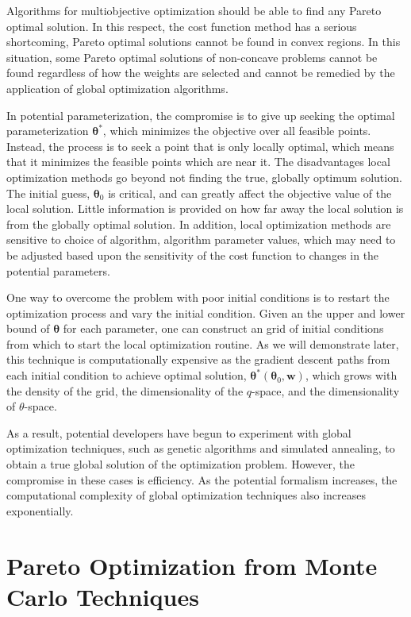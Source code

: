 Algorithms for multiobjective optimization should be able to find any Pareto optimal solution.  In this respect, the cost function method has a serious shortcoming, Pareto optimal solutions cannot be found in convex regions.  In this situation, some Pareto optimal solutions of non-concave problems cannot be found regardless of how the weights are selected and cannot be remedied by the application of global optimization algorithms.

In potential parameterization, the compromise is to give up seeking the optimal parameterization $\bm{\theta}^*$, which minimizes the objective over all feasible points.  Instead, the process is to seek a point that is only locally optimal, which means that it minimizes the feasible points which are near it.  The disadvantages local optimization methods go beyond not finding the true, globally optimum solution.  The initial guess, $\bm{\theta}_0$ is critical, and can greatly affect the objective value of the local solution.  Little information is provided on how far away the local solution is from the globally optimal solution.  In addition, local optimization methods are sensitive to choice of algorithm, algorithm parameter values, which may need to be adjusted based upon the sensitivity of the cost function to changes in the potential parameters.

One way to overcome the problem with poor initial conditions is to restart the optimization process and vary the initial condition.  Given an the upper and lower bound of $\bm{\theta}$ for each parameter, one can construct an grid of initial conditions from which to start the local optimization routine.  As we will demonstrate later, this technique is computationally expensive as the gradient descent paths from each initial condition to achieve optimal solution, $\bm{\theta}^*(\bm{\theta}_0,\bm{w})$, which grows with the density of the grid, the dimensionality of the $q$-space, and the dimensionality of $\theta$-space.

As a result, potential developers have begun to experiment with global optimization techniques, such as genetic algorithms and simulated annealing\cite{martinez2013_fitting,martinez2016_posmat}, to obtain a true global solution of the optimization problem.  However, the compromise in these cases is efficiency.  As the potential formalism increases, the computational complexity of global optimization techniques also increases exponentially.

\section{Pareto Optimization from Monte Carlo Techniques}
\label{sec:potdev_montecarlo}

